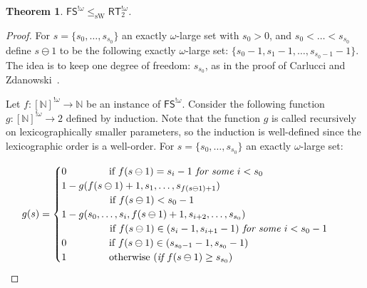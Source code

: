 \documentclass[10pt,a4paper]{article}
\newcommand{\FS}[0]{\mathsf{FS}}
\newcommand{\RT}[0]{\mathsf{RT}}
\newcommand{\NN}[0]{\mathbb{N}}
\newcommand{\sW}{\mathrm{sW}}
\newtheorem{theorem}{Theorem}
\numberwithin{theorem}{section}
\begin{document}
\begin{theorem}\label{thm:fs_red_rt}
    $\FS^{!\omega} \leq_{\sW} \RT^{!\omega}_2$.
\end{theorem}

\begin{proof}
For $s = \{s_0, \dots, s_{s_0}\}$ an exactly $\omega$-large set with $s_0 > 0$, and $s_0 < \dots < s_{s_0}$ define $s \ominus 1$ to be the following exactly $\omega$-large set: $\{s_0 - 1,s_1 - 1, \dots, s_{s_0 - 1} - 1\}$. The idea is to keep one degree of freedom: $s_{s_0}$, as in the proof of Carlucci and Zdanowski~\cite[Proposition 4.1]{carlucci2014strength}.

Let $f : [\NN]^{!\omega} \to \NN$ be an instance of $\FS^{!\omega}$. Consider the following function $g : [\NN]^{!\omega} \to 2$ defined by induction. Note that the function $g$ is called recursively on  lexicographically smaller parameters, so the induction is well-defined since the lexicographic order is a well-order. For $s = \{s_0, \dots, s_{s_0}\}$ an exactly $\omega$-large set:


\begin{equation*}
    g(s) = \begin{cases}
           0 \hspace{1.5cm} \text{if } f(s \ominus 1) = s_i - 1 \textit{ for some } i < s_0 & \\
           1 - g(f(s \ominus 1) + 1, s_1, \dots, s_{f(s \ominus 1) + 1}) & \\ 
            \hspace{1.7cm} \text{if } f(s \ominus 1) < s_0 - 1  \\
           1 - g(s_0, \dots, s_i, f(s \ominus 1) + 1, s_{i+2}, \dots, s_{s_0}) & \\
            \hspace{1.7cm} \text{if } f(s \ominus 1) \in (s_i - 1, s_{i+1} - 1) \textit{ for some } i < s_0 - 1  \\
           0 \hspace{1.5cm} \text{if } f(s \ominus 1) \in (s_{s_0 - 1} - 1, s_{s_0} - 1) \\
           1 \hspace{1.5cm}  \text{otherwise } (\textit{if } f(s \ominus 1) \geq s_{s_0} ) \\      
           \end{cases} \quad
\end{equation*}


\end{proof}
\end{document}
